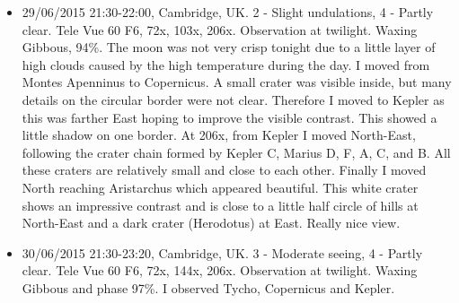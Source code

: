 \begin{itemize}
\item 29/06/2015 21:30-22:00, Cambridge, UK. 2 - Slight undulations, 4 - Partly clear. Tele Vue 60 F6, 72x, 103x, 206x. Observation at twilight. Waxing Gibbous, 94\%. The moon was not very crisp tonight due to a little layer of high clouds caused by the high temperature during the day. I moved from Montes Apenninus to Copernicus. A small crater was visible inside, but many details on the circular border were not clear. Therefore I moved to Kepler as this was farther East hoping to improve the visible contrast. This showed a little shadow on one border. At 206x, from Kepler I moved North-East, following the crater chain formed by Kepler C, Marius D, F, A, C, and B. All these craters are relatively small and close to each other. Finally I moved North reaching Aristarchus which appeared beautiful. This white crater shows an impressive contrast and is close to a little half circle of hills at North-East and a dark crater (Herodotus) at East. Really nice view.
\item 30/06/2015 21:30-23:20, Cambridge, UK. 3 - Moderate seeing, 4 - Partly clear. Tele Vue 60 F6, 72x, 144x, 206x. Observation at twilight. Waxing Gibbous and phase 97\%. I observed Tycho, Copernicus and Kepler. 
\end{itemize}
